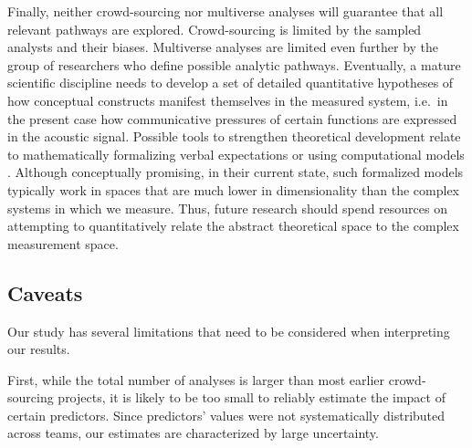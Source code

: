 \documentclass[Review,times,sageh]{sagej}
\begin{document}
Finally, neither crowd-sourcing nor multiverse analyses will guarantee that all relevant pathways are explored.
Crowd-sourcing is limited by the sampled analysts and their biases.
Multiverse analyses are limited even further by the group of researchers who define possible analytic pathways.
Eventually, a mature scientific discipline needs to develop a set of detailed quantitative hypotheses of how conceptual constructs manifest themselves in the measured system, i.e.~in the present case how communicative pressures of certain functions are expressed in the acoustic signal.
Possible tools to strengthen theoretical development relate to mathematically formalizing verbal expectations or using computational models \citep[e.g.,][]{van2020formalizing, guest2021computational, scheel2021hypothesis, devezer2021case}.
Although conceptually promising, in their current state, such formalized models typically work in spaces that are much lower in dimensionality than the complex systems in which we measure. Thus, future research should spend resources on attempting to quantitatively relate the abstract theoretical space to the complex measurement space.

\hypertarget{caveats}{%
\subsection{Caveats}\label{caveats}}

Our study has several limitations that need to be considered when interpreting our results.

First, while the total number of analyses is larger than most earlier crowd-sourcing projects, it is likely to be too small to reliably estimate the impact of certain predictors.
Since predictors' values were not systematically distributed across teams, our estimates are characterized by large uncertainty.
\end{document}
